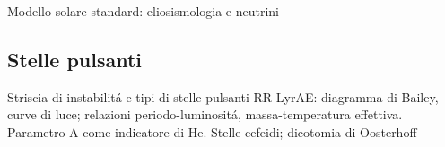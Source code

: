 \begin{frame}{Modello solare standard: eliosismologia e neutrini}
\end{frame}

\subsection{Stelle pulsanti}

\begin{frame}{Striscia di instabilit\'a e tipi di stelle pulsanti}
RR LyrAE: diagramma di Bailey, curve di luce; relazioni periodo-luminosit\'a, massa-temperatura effettiva.
Parametro A come indicatore di He.
Stelle cefeidi; dicotomia di Oosterhoff
\end{frame}